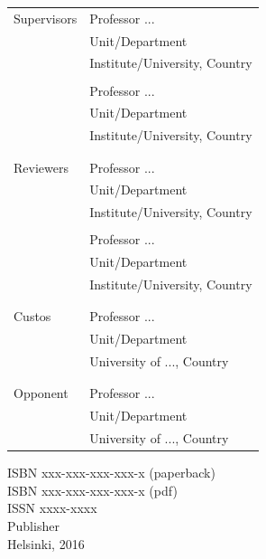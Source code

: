 \documentclass[11pt,b5paper]{book}
\begin{document}
\newpage
\thispagestyle{empty}
\small
\begin{tabular}{ll}
  Supervisors & Professor ... \\
              & Unit/Department \\
              & Institute/University, Country \\
              &  \\
              & Professor ... \\
              & Unit/Department \\
              & Institute/University, Country \\
              & \\
              & \\
  Reviewers   & Professor ... \\
              & Unit/Department \\
              & Institute/University, Country \\
              & \\
              & Professor ... \\
              & Unit/Department \\ 
              & Institute/University, Country \\
              & \\
              & \\
  Custos      & Professor ... \\
              & Unit/Department \\
              & University of ..., Country \\
              & \\
              & \\
  Opponent    & Professor ... \\
              & Unit/Department \\
              & University of ..., Country \\
\end{tabular}

\vspace*{3cm}
\begin{center}
  ISBN xxx-xxx-xxx-xxx-x (paperback) \\
  ISBN xxx-xxx-xxx-xxx-x (pdf) \\
  ISSN xxxx-xxxx \\
  \vspace*{0.5cm}
  Publisher \\
  Helsinki, 2016 \\
\end{center}
\end{document}
